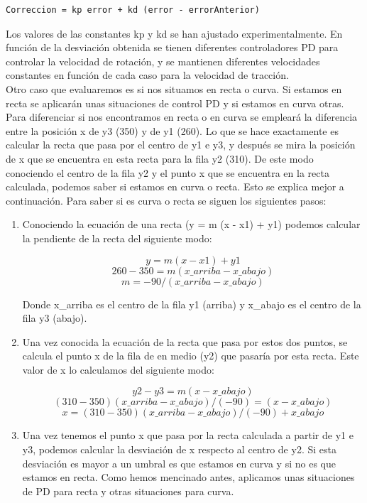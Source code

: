 \vspace{10pt}
\begin{lstlisting}
Correccion = kp error + kd (error - errorAnterior)
\end{lstlisting}
\vspace{20pt}

Los valores de las constantes kp y kd se han ajustado experimentalmente. En función de la desviación obtenida se tienen diferentes controladores PD para controlar la velocidad de rotación, y se mantienen diferentes velocidades constantes en función de cada caso para la velocidad de tracción.\\

Otro caso que evaluaremos es si nos situamos en recta o curva. Si estamos en recta se aplicarán unas situaciones de control PD y si estamos en curva otras. Para diferenciar si nos encontramos en recta o en curva se empleará la diferencia entre la posición x de y3 (350) y de y1 (260). Lo que se hace exactamente es calcular la recta que pasa por el centro de y1 e y3, y después se mira la posición de x que se encuentra en esta recta para la fila y2 (310). De este modo conociendo el centro de la fila y2 y el punto x que se encuentra en la recta calculada, podemos saber si estamos en curva o recta. Esto se explica mejor a continuación. Para saber si es curva o recta se siguen los siguientes pasos:\\

\begin{enumerate}
    \item Conociendo la ecuación de una recta (y = m (x - x1) + y1) podemos calcular la pendiente de la recta del siguiente modo:
    
        \[ y = m (x - x1) + y1 \]
        \[ 260 - 350 = m (x\_arriba - x\_abajo) \]
        \[ m = -90 / (x\_arriba - x\_abajo) \]
        
     Donde x\_arriba es el centro de la fila y1 (arriba) y x\_abajo es el centro de la fila y3 (abajo).
        
    \item Una vez conocida la ecuación de la recta que pasa por estos dos puntos, se calcula el punto x de la fila de en medio (y2) que pasaría por esta recta. Este valor de x lo calculamos del siguiente modo:
        
        \[ y2 - y3 = m (x - x\_abajo) \]
        \[ (310 - 350) (x\_arriba - x\_abajo) / (-90) = (x - x\_abajo)  \]
        \[ x = (310 - 350) (x\_arriba - x\_abajo) / (-90) + x\_abajo  \]
        
    \item  Una vez tenemos el punto x que pasa por la recta calculada a partir de y1 e y3, podemos calcular la desviación de x respecto al centro de y2. Si esta desviación es mayor a un umbral es que estamos en curva y si no es que estamos en recta. Como hemos mencinado antes, aplicamos unas situaciones de PD para recta y otras situaciones para curva.
    
\end{enumerate}

